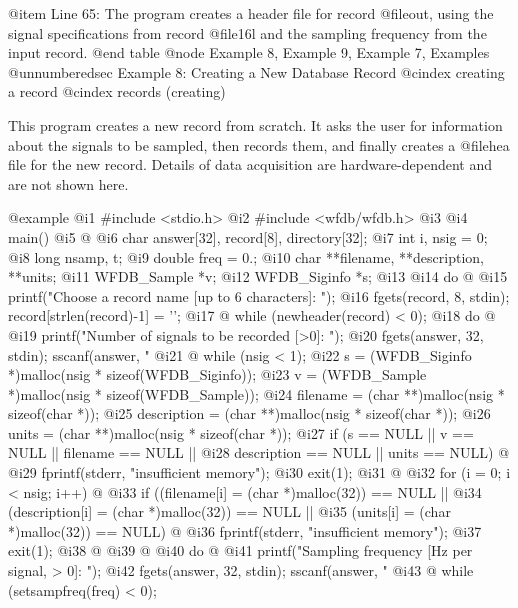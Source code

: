 {{{{{{{{{{@item Line 65:
The program creates a header file for record @file{out}, using
the signal specifications from record @file{16l} and the sampling
frequency from the input record.
@end table
@node     Example 8, Example 9, Example 7, Examples
@unnumberedsec Example 8:  Creating a New Database Record
@cindex creating a record
@cindex records (creating)

This program creates a new record from scratch.  It asks the user for
information about the signals to be sampled, then records them, and
finally creates a @file{hea} file for the new record.  Details of
data acquisition are hardware-dependent and are not shown here. 

@example
  @i{1}  #include <stdio.h>
  @i{2}  #include <wfdb/wfdb.h>
  @i{3}  
  @i{4}  main()
  @i{5}  @{
  @i{6}      char answer[32], record[8], directory[32];
  @i{7}      int i, nsig = 0;
  @i{8}      long nsamp, t;
  @i{9}      double freq = 0.;
 @i{10}      char **filename, **description, **units;
 @i{11}      WFDB_Sample *v;
 @i{12}      WFDB_Siginfo *s;
 @i{13}  
 @i{14}      do @{
 @i{15}          printf("Choose a record name [up to 6 characters]: ");
 @i{16}          fgets(record, 8, stdin); record[strlen(record)-1] = '\0';
 @i{17}      @} while (newheader(record) < 0);
 @i{18}      do @{
 @i{19}          printf("Number of signals to be recorded [>0]: ");
 @i{20}          fgets(answer, 32, stdin); sscanf(answer, "%
 @i{21}      @} while (nsig < 1);
 @i{22}      s = (WFDB_Siginfo *)malloc(nsig * sizeof(WFDB_Siginfo));
 @i{23}      v = (WFDB_Sample *)malloc(nsig * sizeof(WFDB_Sample));
 @i{24}      filename = (char **)malloc(nsig * sizeof(char *));
 @i{25}      description = (char **)malloc(nsig * sizeof(char *));
 @i{26}      units = (char **)malloc(nsig * sizeof(char *));
 @i{27}      if (s == NULL || v == NULL || filename == NULL ||
 @i{28}          description == NULL || units == NULL) @{
 @i{29}          fprintf(stderr, "insufficient memory\n");
 @i{30}          exit(1);
 @i{31}      @}
 @i{32}      for (i = 0; i < nsig; i++) @{
 @i{33}          if ((filename[i] = (char *)malloc(32)) == NULL ||
 @i{34}              (description[i] = (char *)malloc(32)) == NULL ||
 @i{35}              (units[i] = (char *)malloc(32)) == NULL) @{
 @i{36}              fprintf(stderr, "insufficient memory\n");
 @i{37}              exit(1);
 @i{38}          @}
 @i{39}      @}
 @i{40}      do @{
 @i{41}          printf("Sampling frequency [Hz per signal, > 0]: ");
 @i{42}          fgets(answer, 32, stdin); sscanf(answer, "%
 @i{43}      @} while (setsampfreq(freq) < 0);
}}}}}}}}}}}
